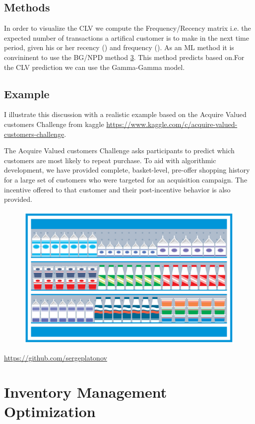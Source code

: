 \documentclass[11pt,fleqn]{book} %
\begin{document}
\section{Methods}

In order to visualize the CLV we compute the Frequency/Recency matrix i.e. the expected number of transactions a artifical customer is to make in the next time period, given his or her recency () and frequency (). As an ML method it is convininent to use the BG/NPD method \ref{}. This method predicts based on.For the CLV prediction we can use the Gamma-Gamma model. 

\section{Example}
I illustrate this discussion with a realistic example based on the Acquire Valued customers Challenge from kaggle \url{https://www.kaggle.com/c/acquire-valued-customers-challenge}.
\begin{remark}
The Acquire Valued customers Challenge asks participants to predict which customers are most likely to repeat purchase. To aid with algorithmic development, we have provided complete, basket-level, pre-offer shopping history for a large set of customers who were targeted for an acquisition campaign. The incentive offered to that customer and their post-incentive behavior is also provided.
\begin{figure}[h]
\center
\includegraphics[width=0.45\linewidth]{Pictures/avsc.png}
\end{figure}
\end{remark}
\url{https://github.com/sergeplatonov}



\chapter{Inventory Management Optimization}
\end{document}
